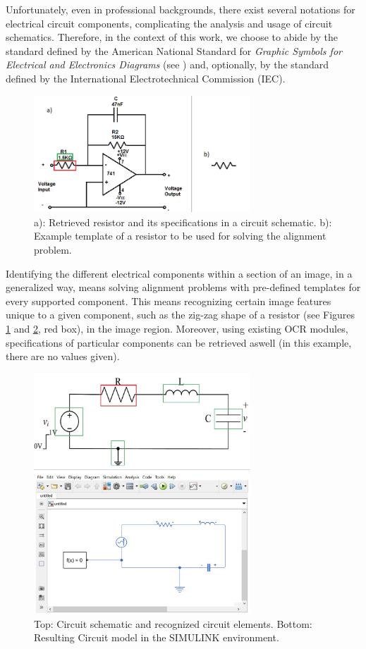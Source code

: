 \documentclass[10pt,twocolumn,letterpaper]{article}
\begin{document}
Unfortunately, even in professional backgrounds, there exist several notations for electrical circuit components, complicating the analysis and usage of circuit schematics. Therefore, in the context of this work, we choose to abide by the standard defined by the American National Standard for \textit{Graphic Symbols for Electrical and Electronics Diagrams } (see \cite{standard1975graphic}) and, optionally, by the standard defined by the International Electrotechnical Commission (IEC).\\

\begin{figure}[!ht]
\includegraphics[width = 3.2in]{SchemeAndResistor.png}
\caption{a): Retrieved resistor and its specifications in a circuit schematic. b): Example template of a resistor to be used for solving the alignment problem.}
\label{fig:alignment}
\end{figure}

Identifying the different electrical components within a section of an image, in a generalized way, means solving alignment problems with pre-defined templates for every supported component. This means recognizing certain image features unique to a given component, such as the zig-zag shape of a resistor (see Figures \ref{fig:alignment} and \ref{fig:progression}, red box), in the image region. Moreover, using existing OCR modules, specifications of particular components can be retrieved aswell (in this example, there are no values given).\\

\begin{figure}[H]
\includegraphics[width = 3.2in]{circ_progression.jpg}
\caption{Top: Circuit schematic and recognized circuit elements. Bottom: Resulting Circuit model in the SIMULINK environment.}
\label{fig:progression}
\end{figure}
\end{document}
